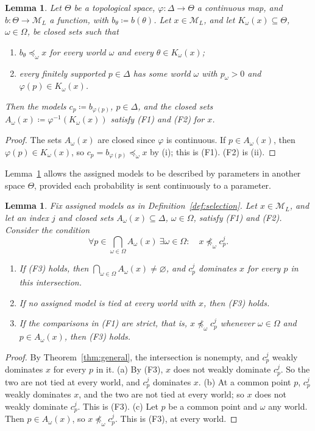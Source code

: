 \documentclass[11pt]{article}
\newtheorem{lemma}[theorem]{Lemma}
\theoremstyle{definition}
\theoremstyle{remark}
\newcommand{\M}{\mathcal M}
\begin{document}
\begin{lemma}\label{lem:reindex}
Let $\Theta$ be a topological space, $\varphi:\Delta\to\Theta$ a continuous map, and $b:\Theta\to\M_L$ a function, with $b_\theta\coloneqq b(\theta)$. Let $x\in\M_L$, and let $K_\omega(x)\subseteq\Theta$, $\omega\in\Omega$, be closed sets such that
\begin{enumerate}[label=(\roman*)]
\item $b_\theta\preceq_\omega x$ for every world $\omega$ and every $\theta\in K_\omega(x)$;
\item every finitely supported $p\in\Delta$ has some world $\omega$ with $p_\omega>0$ and $\varphi(p)\in K_\omega(x)$.
\end{enumerate}
Then the models $c_p\coloneqq b_{\varphi(p)}$, $p\in\Delta$, and the closed sets $A_\omega(x)\coloneqq\varphi^{-1}(K_\omega(x))$ satisfy (F1) and (F2) for $x$.
\end{lemma}
\begin{proof}
The sets $A_\omega(x)$ are closed since $\varphi$ is continuous. If $p\in A_\omega(x)$, then $\varphi(p)\in K_\omega(x)$, so $c_p=b_{\varphi(p)}\preceq_\omega x$ by (i); this is (F1). (F2) is (ii).
\end{proof}
Lemma~\ref{lem:reindex} allows the assigned models to be described by parameters in another space $\Theta$, provided each probability is sent continuously to a parameter.
\endgroup

\begingroup\color{red}
\begin{lemma}\label{lem:no-tie}
Fix assigned models as in Definition~\ref{def:selection}. Let $x\in\M_L$, and let an index $j$ and closed sets $A_\omega(x)\subseteq\Delta$, $\omega\in\Omega$, satisfy (F1) and (F2). Consider the condition
\begin{equation}
\forall p\in\bigcap_{\omega\in\Omega}A_\omega(x)\ \exists\omega\in\Omega:\quad x\not\preceq_\omega c^j_p.\tag{F3}\label{eq:f-notie}
\end{equation}
\begin{enumerate}[label=(\alph*)]
\item If (F3) holds, then $\bigcap_{\omega\in\Omega}A_\omega(x)\ne\varnothing$, and $c^j_p$ dominates $x$ for every $p$ in this intersection.
\item If no assigned model is tied at every world with $x$, then (F3) holds.
\item If the comparisons in (F1) are strict, that is, $x\not\preceq_\omega c^j_p$ whenever $\omega\in\Omega$ and $p\in A_\omega(x)$, then (F3) holds.
\end{enumerate}
\end{lemma}
\begin{proof}
By Theorem~\ref{thm:general}, the intersection is nonempty, and $c^j_p$ weakly dominates $x$ for every $p$ in it. (a) By (F3), $x$ does not weakly dominate $c^j_p$. So the two are not tied at every world, and $c^j_p$ dominates $x$. (b) At a common point $p$, $c^j_p$ weakly dominates $x$, and the two are not tied at every world; so $x$ does not weakly dominate $c^j_p$. This is (F3). (c) Let $p$ be a common point and $\omega$ any world. Then $p\in A_\omega(x)$, so $x\not\preceq_\omega c^j_p$. This is (F3), at every world.
\end{proof}
\end{document}
